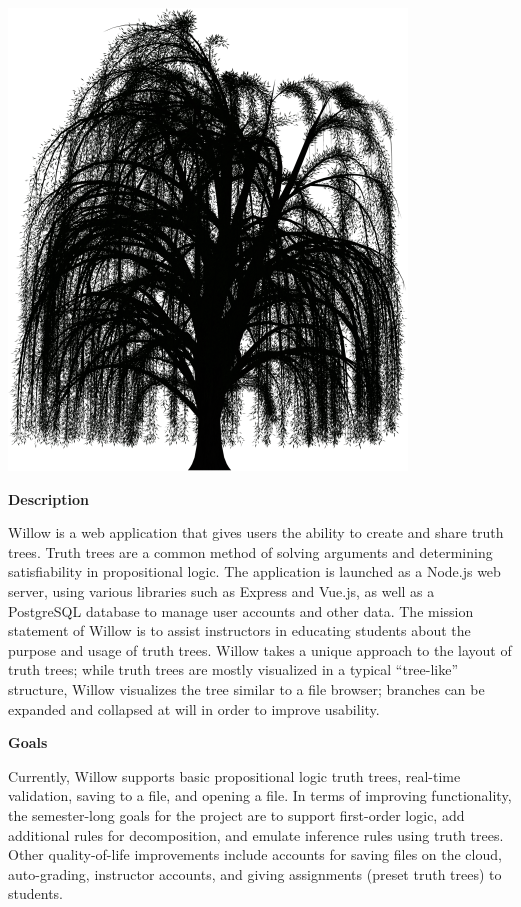 \documentclass{article}
\begin{document}
\begin{center}
  \includegraphics[scale=0.1]{img/logo.png}
  
  
\end{center}

\begin{center}
  \textbf{Description}
\end{center}
\vspace{-10pt}
\noindent Willow is a web application that gives users the ability to create and share truth trees.
Truth trees are a common method of solving arguments and determining satisfiability in propositional logic.
The application is launched as a Node.js web server, using various libraries such as Express and Vue.js, as well as a PostgreSQL database to manage user accounts and other data.
The mission statement of Willow is to assist instructors in educating students about the purpose and usage of truth trees.
Willow takes a unique approach to the layout of truth trees; while truth trees are mostly visualized in a typical ``tree-like'' structure, Willow visualizes the tree similar to a file browser; branches can be expanded and collapsed at will in order to improve usability.

\begin{center}
  \textbf{Goals}
\end{center}
\vspace{-10pt}
\noindent Currently, Willow supports basic propositional logic truth trees, real-time validation, saving to a file, and opening a file.
In terms of improving functionality, the semester-long goals for the project are to support first-order logic, add additional rules for decomposition, and emulate inference rules using truth trees.
Other quality-of-life improvements include accounts for saving files on the cloud, auto-grading, instructor accounts, and giving assignments (preset truth trees) to students.
\end{document}

